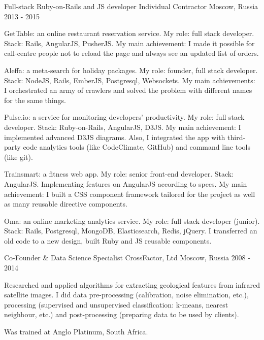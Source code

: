 \begin{cventries}
  \cventry
    {Full-stack Ruby-on-Rails and JS developer} %
    {Individual Contractor} %
    {Moscow, Russia} %
    {2013 - 2015} %
    {
      \begin{cvitems} %
        \item {GetTable: an online restaurant reservation service. My role: full stack developer. Stack: Rails, AngularJS, PusherJS. My main achievement: I made it possible for call-centre people not to reload the page and always see an updated list of orders.}
        \item {Aleffa: a meta-search for holiday packages. My role: founder, full stack developer. Stack: NodeJS, Rails, EmberJS, Postgresql, Websockets. My main achievements: I orchestrated an army of crawlers and solved the problem with different names for the same things.}
        \item {Pulse.io: a service for monitoring developers’ productivity. My role: full stack developer. Stack: Ruby-on-Rails, AngularJS, D3JS. My main achievement: I implemented advanced D3JS diagrams. Also, I integrated the app with third-party code analytics tools (like CodeClimate, GitHub) and command line tools (like git).}
        \item {Trainsmart: a fitness web app. My role: senior front-end developer. Stack: AngularJS. Implementing features on AngularJS according to specs. My main achievement: I built a CSS component framework tailored for the project as well as many reusable directive components.}
        \item {Oma: an online marketing analytics service. My role: full stack developer (junior). Stack: Rails, Postgresql, MongoDB, Elasticsearch, Redis, jQuery. I transferred an old code to a new design, built Ruby and JS reusable components.}
      \end{cvitems}
    }

  \cventry
    {Co-Founder \& Data Science Specialist} %
    {CrossFactor, Ltd} %
    {Moscow, Russia} %
    {2008 - 2014} %
    {
      \begin{cvitems} %
        \item {Researched and applied algorithms for extracting geological features from infrared satellite images. I did data pre-processing (calibration, noise elimination, etc.), processing (supervised and unsupervised classification: k-means, nearest neighbour, etc.) and post-processing (preparing data to be used by clients).}
        \item {Was trained at Anglo Platinum, South Africa.}
      \end{cvitems}
    }


\end{cventries}
